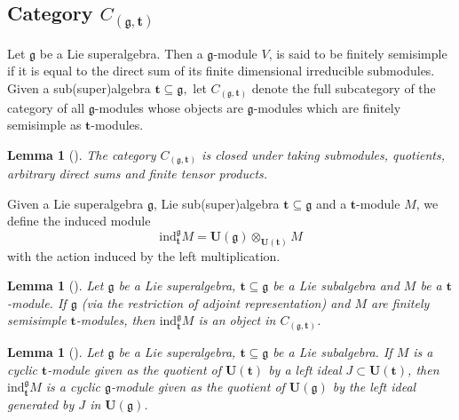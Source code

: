 \documentclass[11pt]{amsart}
\theoremstyle{plain}
\newtheorem{lemma}[thm]{Lemma}
\theoremstyle{definition}
\newcommand{\g}{\mathfrak{g}}
\begin{document}
\subsection{Category $C_{(\g, \mathbf{t})}$}
Let $\g$ be a Lie superalgebra. Then a $\g$-module $V$, is said to be finitely semisimple if it is equal to the direct sum of its finite dimensional irreducible submodules. Given a sub(super)algebra $\mathbf{t}\subseteq\g,$ let $C_{(\g, \mathbf{t})}$ denote the full subcategory of the category of all $\g$-modules whose objects are $\g$-modules which are finitely semisimple as $\mathbf{t}$-modules.

\begin{lemma}[\cite{Kumar2002}]\label{lem:1} 
The category $C_{(\g, \mathbf{t})}$ is closed under taking submodules, quotients, arbitrary direct sums and finite tensor products.
\end{lemma}
Given a Lie superalgebra $\g$, Lie sub(super)algebra $\mathbf{t}\subseteq\g$ and a $\mathbf{t}$-module $M$, we define the induced module 
\begin{equation*}
  \mathrm{ind}^{\g}_\mathbf{t}M=\mathbf{U}(\g)\otimes_{\mathbf{U}(\mathbf{t})}M  
\end{equation*}
with the action induced by the left multiplication.
\begin{lemma}[\cite{BCM19}]\label{lem:2}
Let $\g$ be a Lie superalgebra, $\mathbf{t}\subseteq\g$ be a Lie subalgebra and $M$ be a $
\mathbf{t}$-module. If $\g$ (via the restriction of adjoint representation) and $M$ are finitely semisimple $\mathbf{t}$-modules, then $\mathrm{ind}^{\g}_\mathbf{t} M$ is an object in $C_{(\g, \mathbf{t})}$.
\end{lemma}
\begin{lemma}[\cite{BCM19}]
Let $\g$ be a Lie superalgebra, $\mathbf{t}\subseteq\g$ be a Lie subalgebra. If $M$ is a cyclic $\mathbf{t}$-module given as the quotient of $\mathbf{U}(\mathbf{t})$ by a left ideal $J\subset\mathbf{U}(\mathbf{t})$, then $\mathrm{ind}^{\g}_\mathbf{t}M$ is a cyclic $\g$-module given as the quotient of $\mathbf{U}(\g)$ by the left ideal generated by $J$ in $\mathbf{U}(\g)$.
\end{lemma}
\end{document}

